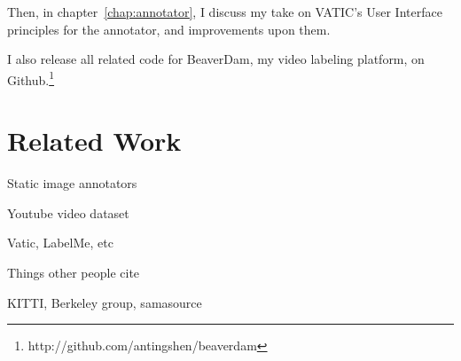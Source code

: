 Then, in chapter~\ref{chap:annotator}, I discuss my take on VATIC's User Interface principles for the annotator, and improvements upon them.

I also release all related code for BeaverDam, my video labeling platform, on Github.\footnote{http://github.com/antingshen/beaverdam}

\section*{Related Work}
\label{sec:related}

Static image annotators

Youtube video dataset

Vatic, LabelMe, etc

Things other people cite

KITTI, Berkeley group, samasource

